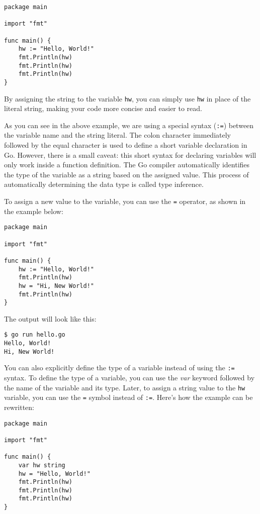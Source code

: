 \begin{lstlisting}[caption=Reusing variable]
package main

import "fmt"

func main() {
    hw := "Hello, World!"
    fmt.Println(hw)
    fmt.Println(hw)
    fmt.Println(hw)
}
\end{lstlisting}

By assigning the string to the variable \texttt{hw}, you can simply
use \texttt{hw} in place of the literal string, making your code more concise
and easier to read.

As you can see in the above example, we are using a special syntax (\texttt{:=})
between the variable name and the string literal. The colon character
immediately followed by the equal character is used to define a short variable
declaration in Go. However, there is a small caveat: this short syntax for
declaring variables will only work inside a function definition. The Go compiler
automatically identifies the type of the variable as a string based on the
assigned value. This process of automatically determining the data type is
called type inference.

To assign a new value to the variable, you can use the \texttt{=} operator, as
shown in the example below:

\begin{lstlisting}[caption=Assign new value to variable]
package main

import "fmt"

func main() {
    hw := "Hello, World!"
    fmt.Println(hw)
    hw = "Hi, New World!"
    fmt.Println(hw)
}
\end{lstlisting}

The output will look like this:

\begin{lstlisting}[numbers=none]
$ go run hello.go
Hello, World!
Hi, New World!
\end{lstlisting}

You can also explicitly define the type of a variable instead of using
the \texttt{:=} syntax. To define the type of a variable, you can use
the \textit{var} keyword followed by the name of the variable and its type.
Later, to assign a string value to the \texttt{hw} variable, you can use
the \texttt{=} symbol instead of \texttt{:=}. Here's how the example can be
rewritten:

\begin{lstlisting}[caption=Alternate syntax for variable declaration]
package main

import "fmt"

func main() {
    var hw string
    hw = "Hello, World!"
    fmt.Println(hw)
    fmt.Println(hw)
    fmt.Println(hw)
}
\end{lstlisting}

